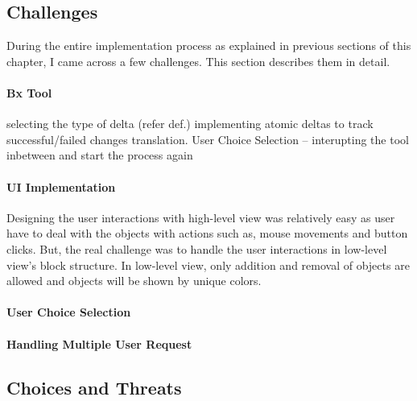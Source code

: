 \subsection{Challenges}\label{subsec:implechallenges}
During the entire implementation process as explained in previous sections of this chapter, I came across a few challenges. This section describes them in detail.

\paragraph{Bx Tool}
selecting the type of delta (refer def.)
implementing atomic deltas to track successful/failed changes translation. 
User Choice Selection -- interupting the tool inbetween and start the process again

\paragraph{UI Implementation}
Designing the user interactions with high-level view was relatively easy as user have to deal with the objects with actions such as, mouse movements and button clicks. But, the real challenge was to handle the user interactions in low-level view's block structure. In low-level view, only addition and removal of objects are allowed and objects will be shown by unique colors. 

\paragraph{User Choice Selection}

\paragraph{Handling Multiple User Request}

\subsection{Choices and Threats}\label{subsec:imple_choicesthreats}
 



